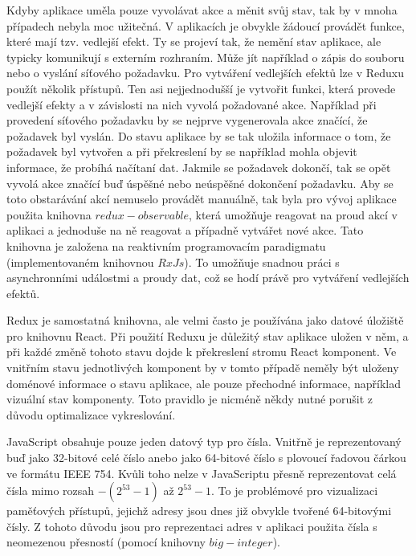 Kdyby aplikace uměla pouze vyvolávat akce a měnit svůj stav, tak by v mnoha případech nebyla moc užitečná. V aplikacích je obvykle žádoucí provádět funkce, které mají tzv. vedlejší efekt. Ty se projeví tak, že nemění stav aplikace, ale typicky komunikují s externím rozhraním. Může jít například o zápis do souboru nebo o vyslání síťového požadavku. Pro vytváření vedlejších efektů lze v Reduxu použít několik přístupů. Ten asi nejjednodušší je vytvořit funkci, která provede vedlejší efekty a v závislosti na nich vyvolá požadované akce. Například při provedení síťového požadavku by se nejprve vygenerovala akce značící, že požadavek byl vyslán. Do stavu aplikace by se tak uložila informace o tom, že požadavek byl vytvořen a při překreslení by se například mohla objevit informace, že probíhá načítaní dat. Jakmile se požadavek dokončí, tak se opět vyvolá akce značící buď úspěšné nebo neúspěšné dokončení požadavku. Aby se toto obstarávání akcí nemuselo provádět manuálně, tak byla pro vývoj aplikace použita knihovna $redux-observable$, která umožňuje reagovat na proud akcí v aplikaci a jednoduše na ně reagovat a případně vytvářet nové akce. Tato knihovna je založena na reaktivním programovacím paradigmatu (implementovaném knihovnou $RxJs$). To umožňuje snadnou práci s asynchronními událostmi a proudy dat, což se hodí právě pro vytváření vedlejších efektů.

Redux je samostatná knihovna, ale velmi často je používána jako datové úložiště pro knihovnu React. Při použití Reduxu je důležitý stav aplikace uložen v něm, a při každé změně tohoto stavu dojde k překreslení stromu React komponent. Ve vnitřním stavu jednotlivých komponent by v tomto případě neměly být uloženy doménové informace o stavu aplikace, ale pouze přechodné informace, například vizuální stav komponenty. Toto pravidlo je nicméně někdy nutné porušit z důvodu optimalizace vykreslování.

JavaScript obsahuje pouze jeden datový typ pro čísla. Vnitřně je reprezentovaný buď jako 32-bitové celé číslo anebo jako 64-bitové číslo s plovoucí řadovou čárkou ve formátu IEEE 754. Kvůli toho nelze v JavaScriptu přesně reprezentovat celá čísla mimo rozsah $-(2^53 - 1)$ až $2^53 - 1$. To je problémové pro vizualizaci paměťových přístupů, jejichž adresy jsou dnes již obvykle tvořené 64-bitovými čísly. Z tohoto důvodu jsou pro reprezentaci adres v aplikaci použita čísla s neomezenou přesností (pomocí knihovny $big-integer$).

